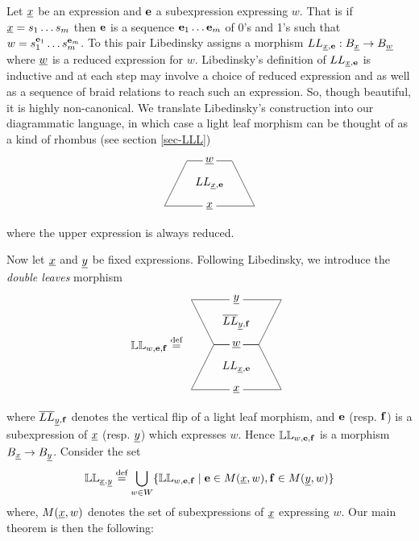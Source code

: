 Let $\underline{x}$ be an expression and ${\mathbf e}$ a subexpression expressing $w$. That is if $\underline{x} = s_1 \dots s_m$ then ${\mathbf e}$ is a sequence ${\mathbf e}_1 \dots {\mathbf e}_m$ of 0's and 1's such that $w = s_1^{{\mathbf e}_1} \dots s_m^{{\mathbf e}_m}$.
To this pair Libedinsky assigns a morphism $LL_{\underline{x},{\mathbf e}} : B_{\underline{x}} \rightarrow B_{\underline{w}}$ where $\underline{w}$ is a reduced expression for $w$. Libedinsky's definition of $LL_{\underline{x}, {\mathbf e}}$ is inductive and at each step may involve a choice of reduced expression and as well as a sequence of braid relations to reach such an expression. So, though beautiful, it is highly non-canonical. We  translate Libedinsky's construction into our diagrammatic language, in which case a light leaf morphism can be thought of as a kind of rhombus (see section \ref{sec-LLL})
\[
\begin{array}{c}
\begin{tikzpicture}[scale=0.7]
\draw (-0.3,-2) -- (-2,-2) -- (-1,0) -- (-0.3,0);
\draw (0.3,-2) -- (2,-2) -- (1,0) -- (0.3,0);
\node (top) at (0,0) {$\un{w}$};
\node (mid) at (0,-1) {$\LL_{\un{x}, \eb}$};
\node (bot) at (0,-2) {$\un{x}$};
\end{tikzpicture}
\end{array}
\]
where the upper expression is always reduced.

Now let $\underline{x}$ and $\underline{y}$ be fixed expressions. 
Following Libedinsky, we introduce the \emph{double leaves} morphism
\[
\LLL_{w,\eb,\fb} \define 
\begin{array}{c}
\begin{tikzpicture}[scale=0.7]
\draw (-0.3,-2) -- (-2,-2) -- (-1,0) -- (-0.3,0);
\draw (0.3,-2) -- (2,-2) -- (1,0) -- (0.3,0);
\draw (-0.3,2) -- (-2,2) -- (-1,0) -- (-0.3,0);
\draw (0.3,2) -- (2,2) -- (1,0) -- (0.3,0);
\node (top) at (0,2) {$\un{y}$};
\node (mid) at (0,1) {$\oLL_{\un{y}, \fb}$};
\node (top) at (0,0) {$\un{w}$};
\node (mid) at (0,-1) {$\LL_{\un{x}, \eb}$};
\node (bot) at (0,-2) {$\un{x}$};
\end{tikzpicture}
\end{array}
\]
where $\overline{LL}_{\underline{y}, {\mathbf f}}$ denotes the vertical flip of a light leaf morphism, and ${\mathbf e}$ (resp. ${\mathbf f}$) is a subexpression of $\underline{x}$ (resp. $\underline{y}$) which expresses $w$. Hence $\mathbb{LL}_{w,{\mathbf e},{\mathbf f}}$ is a morphism $B_{\underline{x}} \rightarrow B_{\underline{y}}$. Consider the set
\[
\mathbb{LL}_{\underline{x}, \underline{y}} \stackrel{\mbox{\scriptsize{def}}}{=} \bigcup_{w \in W} \{ \mathbb{LL}_{w,{\mathbf e},{\mathbf f}} \; | \; {\mathbf e} \in M(\underline{x}, w), {\mathbf f} \in M(\underline{y}, w)\}
\]
where, $M(\underline{x}, w)$ denotes the set of subexpressions of $\underline{x}$ expressing $w$. Our main theorem is then the following:

